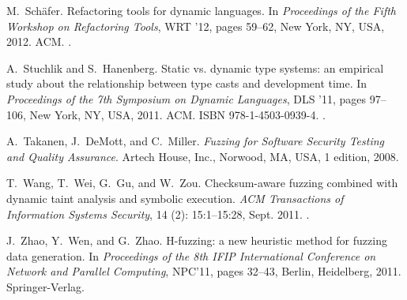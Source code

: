 \documentclass[10pt]{sigplanconf}
\begin{document}
\begin{thebibliography}{35}
M.~Sch\"{a}fer.
\newblock Refactoring tools for dynamic languages.
\newblock In \emph{Proceedings of the Fifth Workshop on Refactoring Tools}, WRT
  '12, pages 59--62, New York, NY, USA, 2012. ACM.
\newblock {}.

\vfill\eject

A.~Stuchlik and S.~Hanenberg.
\newblock Static vs. dynamic type systems: an empirical study about the
  relationship between type casts and development time.
\newblock In \emph{Proceedings of the 7th Symposium on Dynamic Languages}, DLS
  '11, pages 97--106, New York, NY, USA, 2011. ACM.
\newblock ISBN 978-1-4503-0939-4.
\newblock {}.

A.~Takanen, J.~DeMott, and C.~Miller.
\newblock \emph{Fuzzing for Software Security Testing and Quality Assurance}.
\newblock Artech House, Inc., Norwood, MA, USA, 1 edition, 2008.

T.~Wang, T.~Wei, G.~Gu, and W.~Zou.
\newblock Checksum-aware fuzzing combined with dynamic taint analysis and
  symbolic execution.
\newblock \emph{ACM Transactions of Information Systems Security}, 14
  (2): 15:1--15:28, Sept. 2011.
\newblock {}.

J.~Zhao, Y.~Wen, and G.~Zhao.
\newblock H-fuzzing: a new heuristic method for fuzzing data generation.
\newblock In \emph{Proceedings of the 8th IFIP International Conference on
  Network and Parallel Computing}, NPC'11, pages 32--43, Berlin, Heidelberg,
  2011. Springer-Verlag.

\end{thebibliography}
\end{document}
